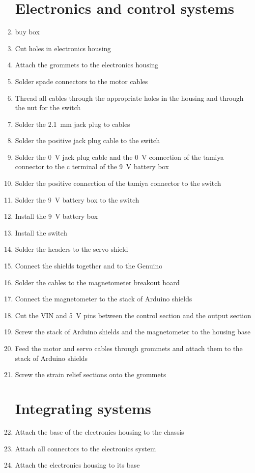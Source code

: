 \begin{multicols}{2}
\begin{enumerate}
    \section{Electronics and control systems}
        \item buy box
        \item Cut holes in electronics housing
        \item Attach the grommets to the electronics housing
        \item Solder spade connectors to the motor cables
        \item Thread all cables through the appropriate holes in the housing and through the nut for the switch
        \item Solder the \SI{2.1}{mm} jack plug to cables
        \item Solder the positive jack plug cable to the switch
        \item Solder the \SI{0}{\volt} jack plug cable and the \SI{0}{\volt} connection of the tamiya connector to the c terminal of the \SI{9}{\volt} battery box
        \item Solder the positive connection of the tamiya connector to the switch
        \item Solder the \SI{9}{\volt} battery box to the switch
        \item Install the \SI{9}{\volt} battery box
        \item Install the switch
        \item Solder the headers to the \gls{servo} \gls{shield}
        \item Connect the \glspl{shield} together and to the \gls{Genuino}
        \item Solder the cables to the \gls{magnetometer} breakout board
        \item Connect the \gls{magnetometer} to the stack of Arduino \glspl{shield}
        \item Cut the VIN and \SI{5}{\volt} pins between the control section and the output section
        \item Screw the stack of Arduino \glspl{shield} and the \gls{magnetometer} to the housing base
        \item Feed the motor and \gls{servo} cables through grommets and attach them to the stack of Arduino \glspl{shield}
        \item Screw the strain relief sections onto the grommets

    \section{Integrating systems}
        \item Attach the base of the electronics housing to the chassis
        \item Attach all connectors to the electronics system
        \item Attach the electronics housing to its base

\end{enumerate}
\end{multicols}
